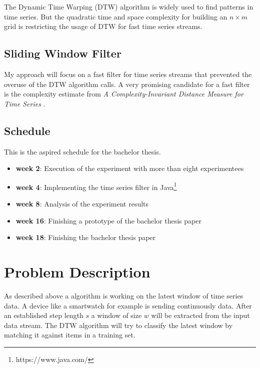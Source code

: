 \documentclass[runningheads,a4paper]{llncs}
\begin{document}
    The Dynamic Time Warping \cite{berndt1994using} (DTW) algorithm is widely used
    to find patterns in time series. But the quadratic time and space complexity for building an $n \times m$ grid is
    restricting the usage of DTW for fast time series streams.

    \subsection{Sliding Window Filter}
    My approach will focus on a fast filter for time series streams that prevented the overuse of the DTW algorithm
    calls. A very promising candidate for a fast filter is the complexity estimate from
    \textit{A Complexity-Invariant Distance Measure for Time Series} \cite{batista2011complexity}.

    \subsection{Schedule}
    This is the aspired schedule for the bachelor thesis.
    \begin{itemize}
        \item \textbf{week 2}: Execution of the experiment with more than eight experimentees
        \item \textbf{week 4}: Implementing the time series filter in Java\footnote{https://www.java.com/}
        \item \textbf{week 8}: Analysis of the experiment results
        \item \textbf{week 16}: Finishing a prototype of the bachelor thesis paper
        \item \textbf{week 18}: Finishing the bachelor thesis paper
    \end{itemize}

    \section{Problem Description}
    As described above a algorithm is working on the latest window of time series data. A device like a smartwatch for
    example is sending continuously data. After an established step length $s$ a window of size $w$ will be extracted
    from the input data stream. The DTW algorithm will try to classify the latest window by matching it against items
    in a training set.
\end{document}
